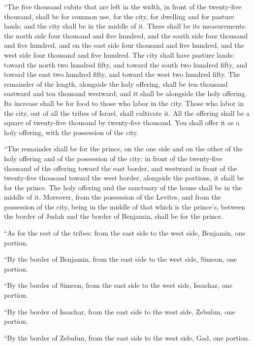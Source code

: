  ``The five thousand cubits that are left in the width, in
front of the twenty-five thousand, shall be for common use, for the
city, for dwelling and for pasture lands; and the city shall be in the
middle of it.  These shall be its measurements: the north
side four thousand and five hundred, and the south side four thousand
and five hundred, and on the east side four thousand and five hundred,
and the west side four thousand and five hundred.  The city
shall have pasture lands: toward the north two hundred fifty, and toward
the south two hundred fifty, and toward the east two hundred fifty, and
toward the west two hundred fifty.  The remainder of the
length, alongside the holy offering, shall be ten thousand eastward and
ten thousand westward; and it shall be alongside the holy offering. Its
increase shall be for food to those who labor in the city. 
Those who labor in the city, out of all the tribes of Israel, shall
cultivate it.  All the offering shall be a square of
twenty-five thousand by twenty-five thousand. You shall offer it as a
holy offering, with the possession of the city.

 ``The remainder shall be for the prince, on the one side
and on the other of the holy offering and of the possession of the city;
in front of the twenty-five thousand of the offering toward the east
border, and westward in front of the twenty-five thousand toward the
west border, alongside the portions, it shall be for the prince. The
holy offering and the sanctuary of the house shall be in the middle of
it.  Moreover, from the possession of the Levites, and from
the possession of the city, being in the middle of that which is the
prince's, between the border of Judah and the border of Benjamin, shall
be for the prince.

 ``As for the rest of the tribes: from the east side to the
west side, Benjamin, one portion.

 ``By the border of Benjamin, from the east side to the
west side, Simeon, one portion.

 ``By the border of Simeon, from the east side to the west
side, Issachar, one portion.

 ``By the border of Issachar, from the east side to the
west side, Zebulun, one portion.

 ``By the border of Zebulun, from the east side to the west
side, Gad, one portion.

